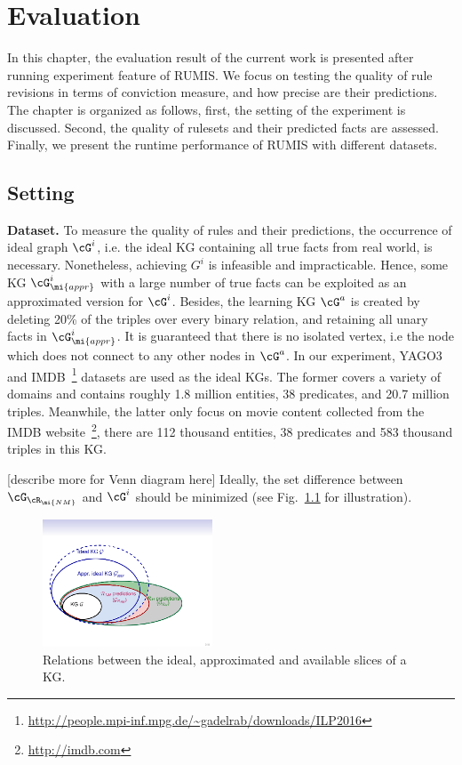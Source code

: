 \chapter{Evaluation}
\label{chap:eval}

In this chapter, the evaluation result of the current work is presented after running experiment feature of RUMIS. We focus on testing the quality of rule revisions in terms of conviction measure, and how precise are their predictions. The chapter is organized as follows, first, the setting of the experiment is discussed. Second, the quality of rulesets and their predicted facts are assessed. Finally, we present the runtime performance of RUMIS with different datasets.

\section{Setting}

\textbf{Dataset.} To measure the quality of rules and their predictions, the occurrence of ideal graph $\cG^i$, i.e. the ideal KG containing all true facts from real world, is necessary. Nonetheless, achieving $G^i$ is infeasible and impracticable. Hence, some KG $\cG^i_{\mi{appr}}$ with a large number of true facts can be exploited as an approximated version for $\cG^i$. Besides, the learning KG $\cG^a$ is created by deleting 20\% of the triples over every binary relation, and retaining all unary facts in $\cG^i_{\mi{appr}}$. It is guaranteed that there is no isolated vertex, i.e the node which does not connect to any other nodes in $\cG^a$. In our experiment, YAGO3~\cite{yago3} and IMDB~\footnote{\url{http://people.mpi-inf.mpg.de/~gadelrab/downloads/ILP2016}} datasets are used as the ideal KGs. The former covers a variety of domains and contains roughly 1.8 million entities, 38 predicates, and 20.7 million triples. Meanwhile, the latter only focus on movie content collected from the IMDB website~\footnote{\url{http://imdb.com}}, there are 112 thousand entities, 38 predicates and 583 thousand triples in this KG.

[describe more for Venn diagram here]
Ideally,  the set difference between $\cG_{\cR_{\mi{NM}}}$ and $ \cG^i$ should be minimized (see  Fig.~\ref{fig:venn} for illustration).

\begin{figure}[ht]
\centering
\includegraphics[width=0.45\textwidth]{figures/big_pic_exp}
\caption{Relations between the ideal, approximated and available slices of a KG.}
\label{fig:venn}
\end{figure}

